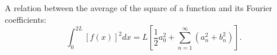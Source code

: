 A relation between the average of the square
of a function and its Fourier coefficients:
 \[ \int_0^{2L}[f(x)]^2 dx=L \left[ \frac{1}{2}a_0^2+ \sum_{n=1}^ \infty
(a_n^2+b_n^2) \right]. \]


